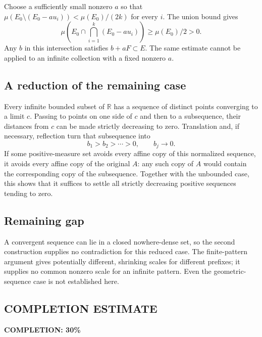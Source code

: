 Choose a sufficiently small nonzero $a$ so that
$\mu(E_0\setminus(E_0-au_i))<\mu(E_0)/(2k)$ for every $i$. The union bound gives
\[
 \mu\left(E_0\cap\bigcap_{i=1}^k(E_0-au_i)\right)\ge\mu(E_0)/2>0.
\]
Any $b$ in this intersection satisfies $b+aF\subset E$. The same estimate cannot be applied to an infinite collection with a fixed nonzero $a$.

\subsection*{A reduction of the remaining case}
Every infinite bounded subset of $\mathbb R$ has a sequence of distinct points converging to a limit $c$. Passing to points on one side of $c$ and then to a subsequence, their distances from $c$ can be made strictly decreasing to zero. Translation and, if necessary, reflection turn that subsequence into
\[
 b_1>b_2>\cdots>0,\qquad b_j\to0.
\]
If some positive-measure set avoids every affine copy of this normalized sequence, it avoids every affine copy of the original $A$: any such copy of $A$ would contain the corresponding copy of the subsequence. Together with the unbounded case, this shows that it suffices to settle all strictly decreasing positive sequences tending to zero.

\subsection*{Remaining gap}
A convergent sequence can lie in a closed nowhere-dense set, so the second construction supplies no contradiction for this reduced case. The finite-pattern argument gives potentially different, shrinking scales for different prefixes; it supplies no common nonzero scale for an infinite pattern. Even the geometric-sequence case is not established here.
\subsection*{COMPLETION ESTIMATE}
\textbf{COMPLETION: 30\%}
